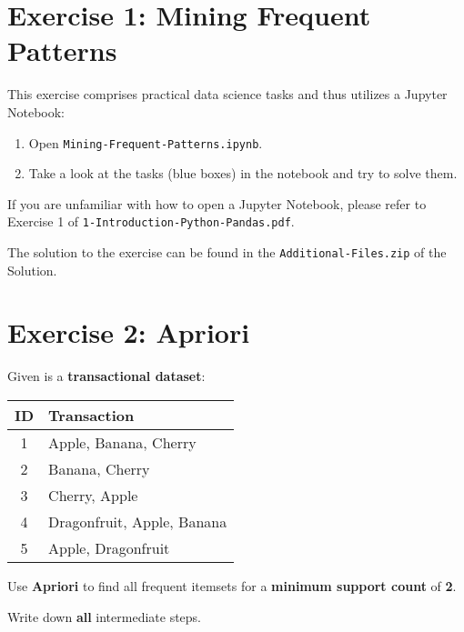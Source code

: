 \documentclass[
english,
smallborders
]{i6prcsht}
\begin{document}
\section*{Exercise 1: Mining Frequent Patterns}

This exercise comprises practical data science tasks and thus utilizes a Jupyter Notebook:

\begin{enumerate}
	\item Open \texttt{Mining-Frequent-Patterns.ipynb}.
	\item Take a look at the tasks (blue boxes) in the notebook and try to solve them.
\end{enumerate}

If you are unfamiliar with how to open a Jupyter Notebook, please refer to Exercise 1 of \texttt{1-Introduction-Python-Pandas.pdf}.

\begin{solution}
	The solution to the exercise can be found in the \texttt{Additional-Files.zip} of the Solution.
\end{solution}

\section*{Exercise 2: Apriori}

Given is a \textbf{transactional dataset}:

\begin{center}
	\begin{tabular}{|c|l|}
		\hline
		\textbf{ID} & \textbf{Transaction}       \\
		\hline
		1           & Apple, Banana, Cherry      \\
		\hline
		2           & Banana, Cherry             \\
		\hline
		3           & Cherry, Apple              \\
		\hline
		4           & Dragonfruit, Apple, Banana \\
		\hline
		5           & Apple, Dragonfruit         \\
		\hline
	\end{tabular}
\end{center}

Use \textbf{Apriori} to find all frequent itemsets for a \textbf{minimum support count} of \textbf{2}.

Write down \textbf{all} intermediate steps.
\end{document}
